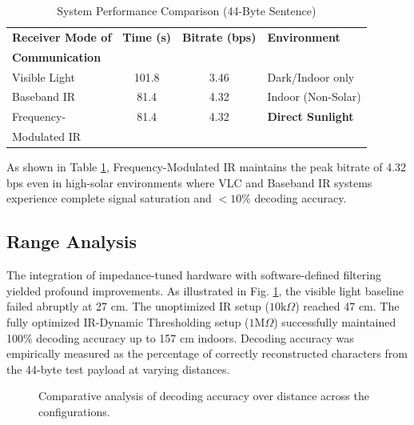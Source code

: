 \documentclass[conference]{IEEEtran}
\begin{document}
\begin{table}[htbp]
\caption{System Performance Comparison (44-Byte Sentence)}
\label{tab:bps}
\centering
\begin{tabular}{|l|c|c|l|}
\hline
\textbf{Receiver Mode of } & \textbf{Time (s)} & \textbf{Bitrate (bps)} & \textbf{Environment} \\ 
\textbf{Communication} & & \\ \hline
Visible Light & 101.8 & 3.46 & Dark/Indoor only \\ \hline
Baseband IR  & 81.4 & 4.32 & Indoor (Non-Solar) \\ \hline
Frequency- & 81.4 & 4.32 & \textbf{Direct Sunlight} \\ 
Modulated IR  & & \\ \hline
\end{tabular}
\end{table}

As shown in Table \ref{tab:bps}, Frequency-Modulated IR maintains the peak bitrate of 4.32 bps even in high-solar environments where VLC and Baseband IR systems experience complete signal saturation and $<10$\% decoding accuracy.

\subsection{Range Analysis}
The integration of impedance-tuned hardware with software-defined filtering yielded profound improvements. As illustrated in Fig. \ref{fig:graph}, the visible light baseline failed abruptly at 27 cm. The unoptimized IR setup ($10\text{k}\Omega$) reached 47 cm. The fully optimized IR-Dynamic Thresholding setup ($1\text{M}\Omega$) successfully maintained 100\% decoding accuracy up to 157 cm indoors. Decoding accuracy was empirically measured as the percentage of correctly reconstructed characters from the 44-byte test payload at varying distances.

\begin{figure}[htbp]
    \centering
    \caption{Comparative analysis of decoding accuracy over distance across the configurations.}
    \label{fig:graph}
\end{figure}
\end{document}
